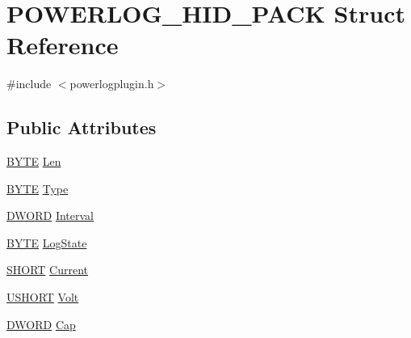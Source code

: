 \hypertarget{struct_p_o_w_e_r_l_o_g___h_i_d___p_a_c_k}{\section{P\-O\-W\-E\-R\-L\-O\-G\-\_\-\-H\-I\-D\-\_\-\-P\-A\-C\-K Struct Reference}
\label{struct_p_o_w_e_r_l_o_g___h_i_d___p_a_c_k}
}


{\ttfamily \#include $<$powerlogplugin.\-h$>$}

\subsection*{Public Attributes}
\begin{DoxyCompactItemize}
\item 
\hyperlink{gcs_2src_2experimental_2_power_log6_s_2main_8cpp_a4ae1dab0fb4b072a66584546209e7d58}{B\-Y\-T\-E} \hyperlink{struct_p_o_w_e_r_l_o_g___h_i_d___p_a_c_k_afca596baeeb6eef4b094d3fb62505d76}{Len}
\item 
\hyperlink{gcs_2src_2experimental_2_power_log6_s_2main_8cpp_a4ae1dab0fb4b072a66584546209e7d58}{B\-Y\-T\-E} \hyperlink{struct_p_o_w_e_r_l_o_g___h_i_d___p_a_c_k_a36832eaffe0839ffe2d8e88787f6a798}{Type}
\item 
\hyperlink{gcs_2src_2experimental_2_power_log6_s_2main_8cpp_ad342ac907eb044443153a22f964bf0af}{D\-W\-O\-R\-D} \hyperlink{struct_p_o_w_e_r_l_o_g___h_i_d___p_a_c_k_ac134fb81539e13bd1050cf7dfc76e600}{Interval}
\item 
\hyperlink{gcs_2src_2experimental_2_power_log6_s_2main_8cpp_a4ae1dab0fb4b072a66584546209e7d58}{B\-Y\-T\-E} \hyperlink{struct_p_o_w_e_r_l_o_g___h_i_d___p_a_c_k_a001f8177243106800aacb838bf8fb368}{Log\-State}
\item 
\hyperlink{gcs_2src_2experimental_2_power_log6_s_2main_8cpp_a9909bd3cf05f0906045f2ee85be4eeac}{S\-H\-O\-R\-T} \hyperlink{struct_p_o_w_e_r_l_o_g___h_i_d___p_a_c_k_af7ee71154ffb1eb06f52a5ddd6192dfc}{Current}
\item 
\hyperlink{gcs_2src_2experimental_2_power_log6_s_2main_8cpp_a5850d5316caf7f4cedd742fdf8cd7c02}{U\-S\-H\-O\-R\-T} \hyperlink{struct_p_o_w_e_r_l_o_g___h_i_d___p_a_c_k_ad9cd709bfba747e457f92eb02eb01146}{Volt}
\item 
\hyperlink{gcs_2src_2experimental_2_power_log6_s_2main_8cpp_ad342ac907eb044443153a22f964bf0af}{D\-W\-O\-R\-D} \hyperlink{struct_p_o_w_e_r_l_o_g___h_i_d___p_a_c_k_a17471b70ab588a58cfdbf608a04a3d53}{Cap}

\end{DoxyCompactItemize}
